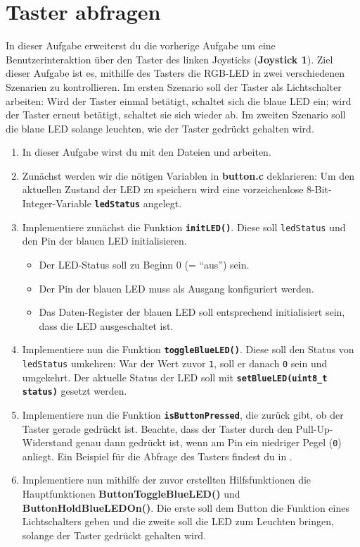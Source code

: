 \section{\ExercisePrefixEmbeddedC Taster abfragen \optional}

In dieser Aufgabe erweiterst du die vorherige Aufgabe um eine Benutzerinteraktion über den Taster des linken Joysticks (\textbf{Joystick 1}).
Ziel dieser Aufgabe ist es, mithilfe des Tasters die RGB-LED in zwei verschiedenen Szenarien zu kontrollieren.
Im ersten Szenario soll der Taster als Lichtschalter arbeiten: Wird der Taster einmal betätigt, schaltet sich die blaue LED ein; wird der Taster erneut betätigt, schaltet sie sich wieder ab.
Im zweiten Szenario soll die blaue LED solange leuchten, wie der Taster gedrückt gehalten wird.

\begin{enumerate}
\item 
In dieser Aufgabe wirst du mit den Dateien  und  arbeiten.

\item 
Zunächst werden wir die nötigen Variablen in \textbf{button.c} deklarieren:
Um den aktuellen Zustand der LED zu speichern wird eine vorzeichenlose 8-Bit-Integer-Variable \textbf{\lstinline|ledStatus|} angelegt.

\item
Implementiere zunächst die Funktion \textbf{\lstinline|initLED()|}.
Diese soll \lstinline|ledStatus| und den Pin der blauen LED initialisieren.
\begin{itemize}
\item 
Der LED-Status soll zu Beginn 0 (= \enquote{aus}) sein.
\item
Der Pin der blauen LED muss als Ausgang konfiguriert werden.
\item 
Das Daten-Register der blauen LED soll entsprechend initialisiert sein, dass die LED ausgeschaltet ist.
\end{itemize}

\item
Implementiere nun die Funktion \textbf{\lstinline|toggleBlueLED()|}.
Diese soll den Status von \lstinline|ledStatus| umkehren:
War der Wert zuvor \lstinline|1|, soll er danach \lstinline|0| sein und umgekehrt.
Der aktuelle Status der LED soll mit \textbf{\lstinline|setBlueLED(uint8_t status)|} gesetzt werden.

\item 
Implementiere nun die Funktion \textbf{\lstinline|isButtonPressed|}, die zurück gibt, ob der Taster gerade gedrückt ist.
Beachte, dass der Taster durch den Pull-Up-Widerstand genau dann gedrückt ist, wenn am Pin ein niedriger Pegel (\lstinline|0|) anliegt.
Ein Beispiel für die Abfrage des Tasters findest du in .

\item
Implementiere nun mithilfe der zuvor erstellten Hilfsfunktionen die Hauptfunktionen \textbf{ButtonToggleBlueLED()} und \textbf{ButtonHoldBlueLEDOn()}.
Die erste soll dem Button die Funktion eines Lichtschalters geben und die zweite soll die LED zum Leuchten bringen, solange der Taster gedrückt gehalten wird. 

\end{enumerate}
